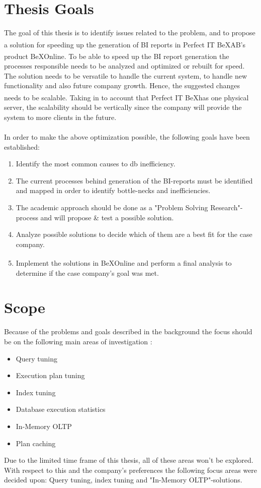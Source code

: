 \documentclass{cslthse-msc}
\newcommand{\bex}{BeX\textsuperscript{\textregistered}}
\begin{document}
\section{Thesis Goals} \label{sec:goals}
The goal of this thesis is to identify issues related to the problem, and to propose a solution for speeding up the generation of BI reports in Perfect IT \bex AB's product \bex Online. To be able to speed up the BI report generation the processes responsible needs to be analyzed and optimized or rebuilt for speed. The solution needs to be versatile to handle the current system, to handle new functionality and also future company growth. Hence, the suggested changes needs to be scalable. Taking in to account that Perfect IT \bex has one physical server, the scalability should be vertically \cite{scalability} since the company will provide the system to more clients in the future.\\\\
In order to make the above optimization possible, the following goals have been established:
\begin{enumerate}
\item Identify the most common causes to db inefficiency.
\item The current processes behind generation of the BI-reports must be identified and mapped in order to identify bottle-necks and inefficiencies.
\item The academic approach should be done as a "Problem Solving Research"-process and will propose \& test a possible solution.
\item Analyze possible solutions to decide which of them are a best fit for the case company.
\item Implement the solutions in \bex Online and perform a final analysis to determine if the case company's goal was met.
\end{enumerate}
  
\section{Scope} \label{sec:scope}
Because of the problems and goals described in the background the focus should be on the following main areas of investigation \cite{Nevarez}:
\begin{itemize}
\item Query tuning
\item Execution plan tuning
\item Index tuning
\item Database execution statistics
\item In-Memory OLTP
\item Plan caching
\end{itemize}
Due to the limited time frame of this thesis, all of these areas won't be explored. With respect to this and the company's preferences the following focus areas were decided upon: Query tuning, index tuning and "In-Memory OLTP"-solutions.
\end{document}
